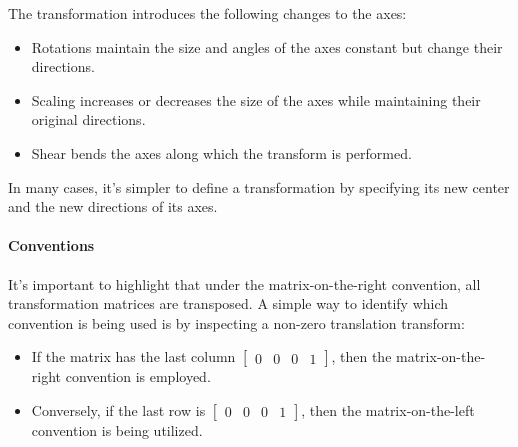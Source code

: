 The transformation introduces the following changes to the axes:
\begin{itemize}
    \item Rotations maintain the size and angles of the axes constant but change their directions.
    \item Scaling increases or decreases the size of the axes while maintaining their original directions.
    \item Shear bends the axes along which the transform is performed.
\end{itemize}
In many cases, it's simpler to define a transformation by specifying its new center and the new directions of its axes.

\paragraph*{Conventions}
It's important to highlight that under the matrix-on-the-right convention, all transformation matrices are transposed.
A simple way to identify which convention is being used is by inspecting a non-zero translation transform:
\begin{itemize}
    \item If the matrix has the last column $\begin{bmatrix}0 & 0 & 0 & 1\end{bmatrix}$, then the matrix-on-the-right convention is employed.
    \item Conversely, if the last row is $\begin{bmatrix}0 & 0 & 0 & 1\end{bmatrix}$, then the matrix-on-the-left convention is being utilized.
\end{itemize}